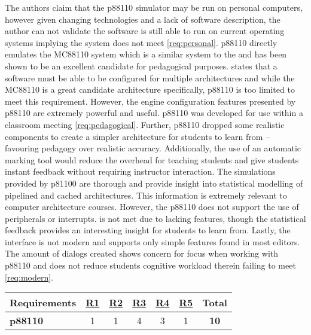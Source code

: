 The authors claim that the p88110 simulator may be run on personal computers, however given changing technologies and a lack of software description, the author can not validate the software is still able to run on current operating systems implying the system does not meet \cref{req:personal}. p88110 directly emulates the MC88110 system which is a similar system to the \hcmodel{} and has been shown to be an excellent candidate for pedagogical purposes.  states that a software must be able to be configured for multiple architectures and while the MC88110 is a great candidate architecture specifically, p88110 is too limited to meet this requirement. However, the engine configuration features presented by p88110 are extremely powerful and useful. p88110 was developed for use within a classroom meeting \cref{req:pedagogical}. Further, p88110 dropped some realistic components to create a simpler architecture for students to learn from -- favouring pedagogy over realistic accuracy. Additionally, the use of an automatic marking tool would reduce the overhead for teaching students and give students instant feedback without requiring instructor interaction. The simulations provided by p81100 are thorough and provide insight into statistical modelling of pipelined and cached architectures. This information is extremely relevant to computer architecture courses. However, the p88110 does not support the use of peripherals or interrupts.  is not met due to lacking features, though the statistical feedback provides an interesting insight for students to learn from. Lastly, the interface is not modern and supports only simple features found in most editors. The amount of dialogs created shows concern for focus when working with p88110 and does not reduce students cognitive workload therein failing to meet \cref{req:modern}. 

\begin{table}[h!]
    \centering
    \begin{tabular}{lcccccc}
        \textbf{Requirements} & \textbf{\hyperref[req:personal]{R1}} & \textbf{\hyperref[req:configuration]{R2}} & \textbf{\hyperref[req:pedagogical]{R3}} & \textbf{\hyperref[req:simulations]{R4}} & \textbf{\hyperref[req:modern]{R5}} & \textbf{Total} \\ \hline
        \textbf{p88110 \cite{Garcia2009}}
        & 1 & 1 & 4 & 3 & 1 & \textbf{10} \\
    \end{tabular}
\end{table}

